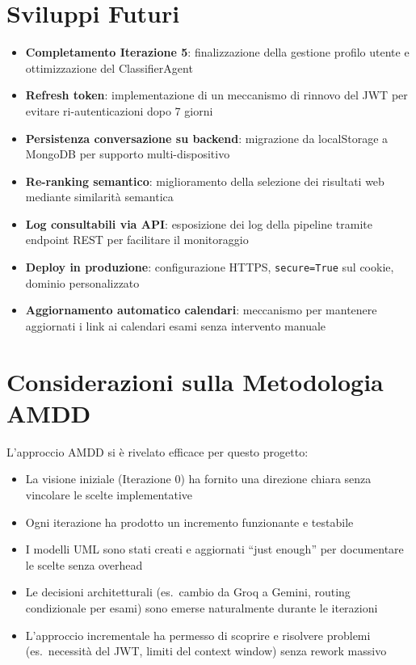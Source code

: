 \documentclass[a4paper,12pt]{report}
\begin{document}
\section{Sviluppi Futuri}

\begin{itemize}
    \item \textbf{Completamento Iterazione 5}: finalizzazione della gestione profilo utente e ottimizzazione del ClassifierAgent
    \item \textbf{Refresh token}: implementazione di un meccanismo di rinnovo del JWT per evitare ri-autenticazioni dopo 7 giorni
    \item \textbf{Persistenza conversazione su backend}: migrazione da localStorage a MongoDB per supporto multi-dispositivo
    \item \textbf{Re-ranking semantico}: miglioramento della selezione dei risultati web mediante similarità semantica
    \item \textbf{Log consultabili via API}: esposizione dei log della pipeline tramite endpoint REST per facilitare il monitoraggio
    \item \textbf{Deploy in produzione}: configurazione HTTPS, \texttt{secure=True} sul cookie, dominio personalizzato
    \item \textbf{Aggiornamento automatico calendari}: meccanismo per mantenere aggiornati i link ai calendari esami senza intervento manuale
\end{itemize}

\section{Considerazioni sulla Metodologia AMDD}

L'approccio AMDD si è rivelato efficace per questo progetto:
\begin{itemize}
    \item La visione iniziale (Iterazione 0) ha fornito una direzione chiara senza vincolare le scelte implementative
    \item Ogni iterazione ha prodotto un incremento funzionante e testabile
    \item I modelli UML sono stati creati e aggiornati ``just enough'' per documentare le scelte senza overhead
    \item Le decisioni architetturali (es.\ cambio da Groq a Gemini, routing condizionale per esami) sono emerse naturalmente durante le iterazioni
    \item L'approccio incrementale ha permesso di scoprire e risolvere problemi (es.\ necessità del JWT, limiti del context window) senza rework massivo
\end{itemize}
\end{document}
